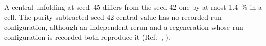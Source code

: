 A central unfolding at seed~45 differs from the seed-42 one by at most \SI{1.4}{\percent} in a cell. The purity-subtracted seed-42 central value has no recorded run configuration, although an independent rerun and a regeneration whose run configuration is recorded both reproduce it (Ref.~\cite{NoteRecords2026}, ).
